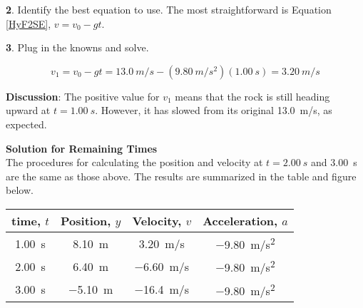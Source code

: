 \documentclass[../../main-ap-physics.tex]{subfiles}
\begin{document}
\textbf{2}. Identify the best equation to use. The most straightforward is Equation \eqref{HyF2SE}, $v = v_0 - gt$.

\vspace{1em}

\textbf{3}. Plug in the knowns and solve.

\begin{equation*}
    v_1 = v_0 - gt = \SI{13.0}{m/s} - \left(\SI{9.80}{m/s^2}\right) \left(\SI{1.00}{s}\right) = \SI{3.20}{m/s}
\end{equation*}

\textbf{Discussion}: The positive value for $v_1$ means that the rock is still heading upward at $t = \SI{1.00}{s}$. However, it has slowed from its original \SI{13.0}{m/s}, as expected.

\vspace{1em}

\textbf{Solution for Remaining Times}\\
The procedures for calculating the position and velocity at $t = \SI{2.00}{s}$ and \SI{3.00}{s} are the same as those above. The results are summarized in the table and figure below.

\begin{center}
    \begin{tabular}{c|c|c|c}
        \textbf{time, $t$} & \textbf{Position, $y$} & \textbf{Velocity, $v$} & \textbf{Acceleration, $a$} \\ \hline
        \SI{1.00}{s} & \SI{8.10}{m} & \SI{3.20}{m/s} & \SI{-9.80}{m/s^2}\\ 
        \SI{2.00}{s} & \SI{6.40}{m} & \SI{-6.60}{m/s} & \SI{-9.80}{m/s^2}\\
        \SI{3.00}{s} & \SI{-5.10}{m} & \SI{-16.4}{m/s} & \SI{-9.80}{m/s^2}\\ \hline
    \end{tabular}
\end{center}
\end{document}
